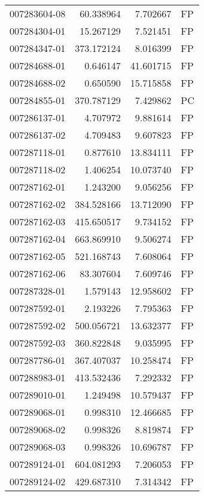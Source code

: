 \begin{tabular}{lrrl}
007283604-08 &   60.338964 &       7.702667 &   FP \\
007284304-01 &   15.267129 &       7.521451 &   FP \\
007284347-01 &  373.172124 &       8.016399 &   FP \\
007284688-01 &    0.646147 &      41.601715 &   FP \\
007284688-02 &    0.650590 &      15.715858 &   FP \\
007284855-01 &  370.787129 &       7.429862 &   PC \\
007286137-01 &    4.707972 &       9.881614 &   FP \\
007286137-02 &    4.709483 &       9.607823 &   FP \\
007287118-01 &    0.877610 &      13.834111 &   FP \\
007287118-02 &    1.406254 &      10.073740 &   FP \\
007287162-01 &    1.243200 &       9.056256 &   FP \\
007287162-02 &  384.528166 &      13.712090 &   FP \\
007287162-03 &  415.650517 &       9.734152 &   FP \\
007287162-04 &  663.869910 &       9.506274 &   FP \\
007287162-05 &  521.168743 &       7.608064 &   FP \\
007287162-06 &   83.307604 &       7.609746 &   FP \\
007287328-01 &    1.579143 &      12.958602 &   FP \\
007287592-01 &    2.193226 &       7.795363 &   FP \\
007287592-02 &  500.056721 &      13.632377 &   FP \\
007287592-03 &  360.822848 &       9.035995 &   FP \\
007287786-01 &  367.407037 &      10.258474 &   FP \\
007288983-01 &  413.532436 &       7.292332 &   FP \\
007289010-01 &    1.249498 &      10.579437 &   FP \\
007289068-01 &    0.998310 &      12.466685 &   FP \\
007289068-02 &    0.998326 &       8.819874 &   FP \\
007289068-03 &    0.998326 &      10.696787 &   FP \\
007289124-01 &  604.081293 &       7.206053 &   FP \\
007289124-02 &  429.687310 &       7.314342 &   FP \\

\end{tabular}
